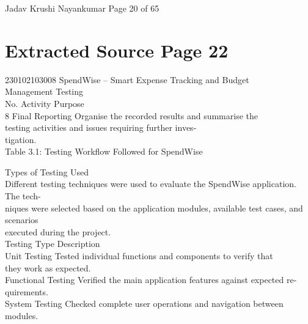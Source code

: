 \documentclass[12pt,a4paper]{report}
\begin{document}
\smallskip

\smallskip
Jadav Krushi Nayankumar                                                       Page 20 of 65\\ 

\clearpage
\section*{Extracted Source Page 22}
230102103008                           SpendWise – Smart Expense Tracking and Budget\\ 
Management Testing\\ 

\smallskip
No.      Activity                     Purpose\\ 
8        Final Reporting              Organise the recorded results and summarise the\\ 
testing activities and issues requiring further inves-\\ 
tigation.\\ 

\smallskip
Table 3.1: Testing Workflow Followed for SpendWise\\ 

\smallskip

\smallskip

 Types of Testing Used\\ 

\smallskip
Different testing techniques were used to evaluate the SpendWise application. The tech-\\ 
niques were selected based on the application modules, available test cases, and scenarios\\ 
executed during the project.\\ 

\smallskip
Testing Type                    Description\\ 

\smallskip
Unit Testing                    Tested individual functions and components to verify that\\ 
they work as expected.\\ 

\smallskip
Functional Testing              Verified the main application features against expected re-\\ 
quirements.\\ 

\smallskip
System Testing                  Checked complete user operations and navigation between\\ 
modules.\\ 
\end{document}
